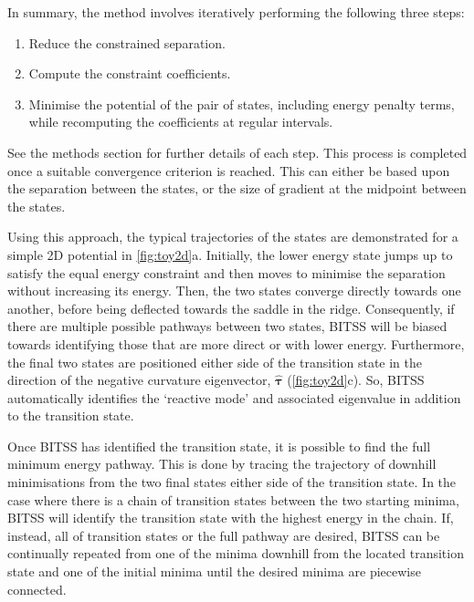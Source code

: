 \documentclass[twocolumn,10pt]{revtex4-2}
\begin{document}
In summary, the method involves iteratively performing the following three steps:
\begin{enumerate}
  \item Reduce the constrained separation.
  \item Compute the constraint coefficients.
  \item Minimise the potential of the pair of states, including energy penalty terms, while recomputing the coefficients at regular intervals.
\end{enumerate}
See the methods section for further details of each step.
This process is completed once a suitable convergence criterion is reached.
This can either be based upon the separation between the states, or the size of gradient at the midpoint between the states.

Using this approach, the typical trajectories of the states are demonstrated for a simple 2D potential in \cref{fig:toy2d}a.
Initially, the lower energy state jumps up to satisfy the equal energy constraint and then moves to minimise the separation without increasing its energy.
Then, the two states converge directly towards one another, before being deflected towards the saddle in the ridge.
Consequently, if there are multiple possible pathways between two states, BITSS will be biased towards identifying those that are more direct or with lower energy.
Furthermore, the final two states are positioned either side of the transition state in the direction of the negative curvature eigenvector, $\bm{\hat{\tau}}$ (\cref{fig:toy2d}c).
So, BITSS automatically identifies the `reactive mode' and associated eigenvalue in addition to the transition state.

Once BITSS has identified the transition state, it is possible to find the full minimum energy pathway.
This is done by tracing the trajectory of downhill minimisations from the two final states either side of the transition state.
In the case where there is a chain of transition states between the two starting minima, BITSS will identify the transition state with the highest energy in the chain.
If, instead, all of transition states or the full pathway are desired, BITSS can be continually repeated from one of the minima downhill from the located transition state and one of the initial minima until the desired minima are piecewise connected.
\end{document}
